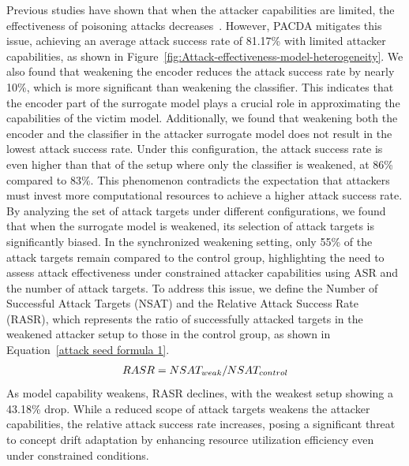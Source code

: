 \documentclass[conference,compsoc]{IEEEtran} %
\begin{document}
Previous studies have shown that when the attacker  capabilities are limited, the effectiveness of poisoning attacks decreases~\cite{2022-ACM-Computing-Survey-Threats-to-training}.
However, PACDA mitigates this issue, achieving an average attack success rate of 81.17\% with limited attacker capabilities, as shown in Figure~\ref{fig:Attack-effectiveness-model-heterogeneity}. 
We also found that weakening the encoder reduces the attack success rate by nearly 10\%, which is more significant than weakening the classifier.  
This indicates that the encoder part of the surrogate model plays a crucial role in approximating the capabilities of the victim model.
Additionally, we found that weakening both the encoder and the classifier in the attacker  surrogate model does not result in the lowest attack success rate.
Under this configuration, the attack success rate is even higher than that of the setup where only the classifier is weakened, at 86\% compared to 83\%.
This phenomenon contradicts the expectation that attackers must invest more computational resources to achieve a higher attack success rate.
By analyzing the set of attack targets under different configurations, we found that when the surrogate model is weakened, its selection of attack targets is significantly biased.
In the synchronized weakening setting, only 55\% of the attack targets remain compared to the control group, highlighting the need to assess attack effectiveness under constrained attacker capabilities using ASR and the number of attack targets.
To address this issue, we define the Number of Successful Attack Targets (NSAT) and the Relative Attack Success Rate (RASR), which represents the ratio of successfully attacked targets in the weakened attacker  setup to those in the control group, as shown in Equation~\ref{attack seed formula 1}.
\begin{equation}
	\begin{aligned}
		RASR = \small NSAT_{weak}/\small NSAT_{control}
	\end{aligned}
	\label{attack seed formula 1}
\end{equation}
As model capability weakens, RASR declines, with the weakest setup showing a 43.18\% drop.
While a reduced scope of attack targets weakens the attacker  capabilities, the relative attack success rate increases, posing a significant threat to concept drift adaptation by enhancing resource utilization efficiency even under constrained conditions.
\end{document}
